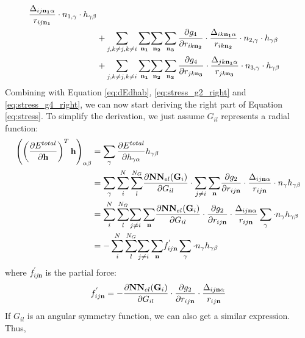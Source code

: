 \documentclass[prb,preprint]{revtex4-2}
\begin{document}
{\begin{align}
{{{\frac{\Delta_{ij\mathbf{n_1}\alpha}}{r_{ij\mathbf{n_1}}} \cdot n_{1,\gamma} \cdot h_{\gamma\beta}}}} \nonumber \\
& + \sum_{j, k \neq j, k \neq i}{
    \sum_{\mathbf{n_1}}}{\sum_{\mathbf{n_2}}{\sum_{\mathbf{n_3}}{
\frac{\partial g_4}{\partial r_{ik\mathbf{n_2}}} \cdot 
\frac{\Delta_{ik\mathbf{n_1}\alpha}}{r_{ik\mathbf{n_2}}} \cdot n_{2,\gamma} \cdot h_{\gamma\beta}
}}} \nonumber \\
& + \sum_{j, k \neq j, k \neq i}{
    \sum_{\mathbf{n_1}}}{\sum_{\mathbf{n_2}}{\sum_{\mathbf{n_3}}{
\frac{\partial g_4}{\partial r_{jk\mathbf{n_3}}} \cdot 
\frac{\Delta_{jk\mathbf{n_1}\alpha}}{r_{jk\mathbf{n_3}}} \cdot n_{3,\gamma} \cdot h_{\gamma\beta}
}}}
\end{align}
Combining with Equation \ref{eq:dEdhab}, \ref{eq:stress_g2_right} and 
\ref{eq:stress_g4_right}, we can now start deriving the right part of Equation 
\ref{eq:stress}. To simplify the derivation, we just assume $G_{il}$ represents
a radial function:
\newcommand{\dE}{\partial{E^{total}}}
\begin{align}
\label{eq:dEdhTh_g2_expanded}
\left(
    \left(\frac{\partial E^{total}}{\partial \mathbf{h}}\right)^T \mathbf{h}
\right)_{\alpha\beta} & = 
\sum_{\gamma}{\frac{\dE}{\partial \hga} \hgb} \nonumber \\
& = \sum_{\gamma}{\sum_{i}^{N}{\sum_{l}^{N_G}}{
    \frac{\partial \mathbf{NN}_{el}(\mathbf{G}_i)}{\partial G_{il}}
    \cdot
    \sum_{j \neq i}{\sum_{\mathbf{n}}}{
    \frac{\partial g_2}{\partial \rijn} 
    \cdot 
    \frac{\Delta_{ij\mathbf{n}\alpha}}{\rijn} \cdot n_{\gamma}} \hgb
}} \nonumber \\
& = \sum_{i}^{N}{\sum_{l}^{N_G}}{\sum_{j \neq i}{\sum_{\mathbf{n}}}{
    \frac{\partial \mathbf{NN}_{el}(\mathbf{G}_i)}{\partial G_{il}}
    \cdot
    \frac{\partial g_2}{\partial \rijn} 
    \cdot 
    \frac{\Delta_{ij\mathbf{n}\alpha}}{\rijn}}
    \sum_{\gamma}{\cdot n_{\gamma}\hgb}
} \nonumber \\
& = -\sum_{i}^{N}{\sum_{l}^{N_G}}{\sum_{j \neq i}{\sum_{\mathbf{n}}}{
    f^{'}_{ij\mathbf{n}}
    \sum_{\gamma}{\cdot n_{\gamma}\hgb}
}}
\end{align}
where $f^{'}_{ij\mathbf{n}}$ is the partial force:
\begin{equation}
f^{'}_{ij\mathbf{n}} = 
-\frac{\partial \mathbf{NN}_{el}(\mathbf{G}_i)}{\partial G_{il}} \cdot 
\frac{\partial g_2}{\partial r_{ij\mathbf{n}}} \cdot 
\frac{\Delta_{ij\mathbf{n}\alpha}}{r_{ij\mathbf{n}}}
\end{equation}
If $G_{il}$ is an angular symmetry function, we can also get a similar 
expression. Thus,
\begin{equation}

\end{equation}}
\end{document}

